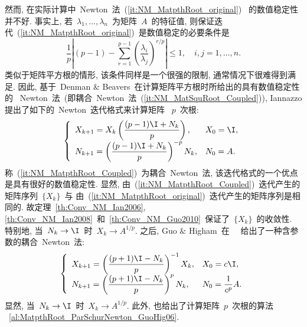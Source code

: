 然而, 在实际计算中~Newton~法~(\ref{it:NM_MatpthRoot_original})~
的数值稳定性并不好. 事实上, 若~$\lambda_1, \ldots,
\lambda_n$~为矩阵~$A$~的特征值,
则保证迭代~(\ref{it:NM_MatpthRoot_original})~是数值稳定的必要条件是~\cite{Smith2003}
$$
\frac{1}{p} \left|(p-1) - \sum_{r=1}^{p-1}
\left(\frac{\lambda_i}{\lambda_j}\right)^{r/p}\right| \leq 1, \quad
i, j = 1, \ldots, n.
$$
类似于矩阵平方根的情形, 该条件同样是一个很强的限制,
通常情况下很难得到满足. 因此, 基于~Denman $\&$
Beavers~在计算矩阵平方根时所给出的具有数值稳定性的
~Newton~法~(即耦合~Newton~法~(\ref{it:NM_MatSquRoot_Coupled})),
Iannazzo \cite{Iannazzo2006}提出了如下的~Newton~迭代格式来计算矩阵
~$p$~次根:
\begin{equation}
\label{it:NM_MatpthRoot_Coupled} \left\{
\begin{array}{ll}
\displaystyle X_{k + 1} = X_k \left(\frac{(p-1)\I + N_k}{p}\right),
& X_0 = \I, \\
\displaystyle N_{k + 1} = \left(\frac{(p-1)\I + N_k}{p}\right)^{- p}
N_k, & N_0 = A.
\end{array} \right.
\end{equation}
称~(\ref{it:NM_MatpthRoot_Coupled})~为耦合~Newton~法,
该迭代格式的一个优点是具有很好的数值稳定性. 显然,
由~(\ref{it:NM_MatpthRoot_Coupled})~迭代产生的矩阵序列~$\{X_k\}$~与
由~(\ref{it:NM_MatpthRoot_original})~迭代产生的矩阵序列是相同的.
故定理~\ref{th:Conv_NM_Ian2006},
\ref{th:Conv_NM_Ian2008}~和~\ref{th:Conv_NM_Guo2010}~保证了~$\{X_k\}$~的收敛性.
特别地, 当~$N_k \to \I$~时~$X_k \to A^{1/p}$. 之后, Guo $\&$
Higham~在~ \cite{GuoHigham2006}~给出了一种含参数的耦合~Newton~法:
\begin{equation}
\label{it:NM_MatpthRoot_ParCoupled} \left\{
\begin{array}{ll}
\displaystyle X_{k + 1} = \left(\frac{(p+1)\I -
N_k}{p}\right)^{-1}X_k,
& X_0 = c\I, \\
\displaystyle N_{k + 1} = \left(\frac{(p+1)\I - N_k}{p}\right)^p
N_k, & \displaystyle N_0 = \frac{1}{c^p}A.
\end{array} \right.
\end{equation}
显然, 当~$N_k \to \I$~时~$X_k \to A^{1/p}$. 此外,
也给出了计算矩阵~$p$~次根的算法
~\ref{al:MatpthRoot_ParSchurNewton_GuoHig06}.

